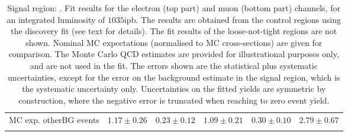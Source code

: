 \begin{table}
\begin{center}
{\begin{tabular*}{\textwidth}{@{\extracolsep{\fill}}lrrrrr}
        MC exp. otherBG events         & $1.17 \pm 0.26$          & $0.23 \pm 0.12$          & $1.09 \pm 0.21$          & $0.30 \pm 0.10$          & $2.79 \pm 0.67$              \\
\noalign{\smallskip}\hline\noalign{\smallskip}
\end{tabular*}
}
\end{center}
\caption{Signal region: . Fit results for the electron (top part) and muon (bottom part) channels, for an integrated luminosity of $1035$ipb.
The results are obtained from the control regions using the discovery fit (see text for details). The fit results of the loose-not-tight regions are not shown.
Nominal MC expectations (normalised to MC cross-sections) are given for comparison. 
The Monte Carlo QCD estimates are provided for illustrational purposes only, and are not used in the fit.
The errors shown are the statistical plus systematic uncertainties, except for the error on the background estimate in the signal region, which is the systematic uncertainty only.
Uncertainties on the fitted yields are symmetric by construction, 
where the negative error is truncated when reaching to zero event yield.
}
\label{table.results.systematics.in.logL.fit.table.results.yields}
\end{table}
%
